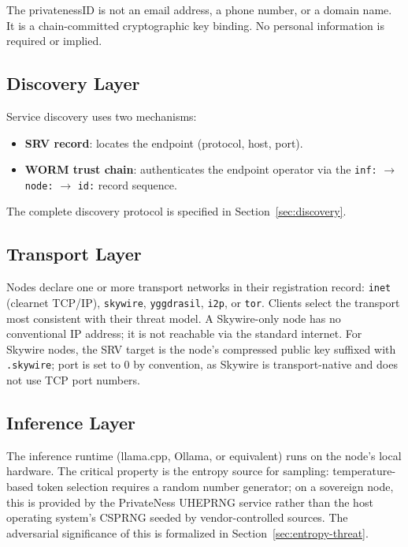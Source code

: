 \documentclass[11pt,a4paper]{article}
\theoremstyle{definition}
\begin{document}
The privatenessID is not an email address, a phone number, or a domain name.
It is a chain-committed cryptographic key binding.  No personal information
is required or implied.

\subsection{Discovery Layer}

Service discovery uses two mechanisms:
\begin{itemize}
  \item \textbf{SRV record}: locates the endpoint (protocol, host, port).
  \item \textbf{WORM trust chain}: authenticates the endpoint operator via
    the \texttt{inf:} $\to$ \texttt{node:} $\to$ \texttt{id:} record sequence.
\end{itemize}

The complete discovery protocol is specified in Section~\ref{sec:discovery}.

\subsection{Transport Layer}

Nodes declare one or more transport networks in their registration record:
\texttt{inet} (clearnet TCP/IP), \texttt{skywire}, \texttt{yggdrasil},
\texttt{i2p}, or \texttt{tor}.  Clients select the transport most consistent
with their threat model.  A Skywire-only node has no conventional IP address; it is not reachable via the standard internet.  For Skywire nodes, the SRV target is the node's
compressed public key suffixed with \texttt{.skywire}; port is set to 0 by
convention, as Skywire is transport-native and does not use TCP port numbers.

\subsection{Inference Layer}

The inference runtime (llama.cpp, Ollama, or equivalent) runs on the node's
local hardware.  The critical property is the entropy source for sampling:
temperature-based token selection requires a random number generator; on a
sovereign node, this is provided by the PrivateNess UHEPRNG service
\cite{pyuheprng} rather than the host operating system's CSPRNG seeded by
vendor-controlled sources.  The adversarial significance of this is formalized
in Section~\ref{sec:entropy-threat}.
\end{document}
